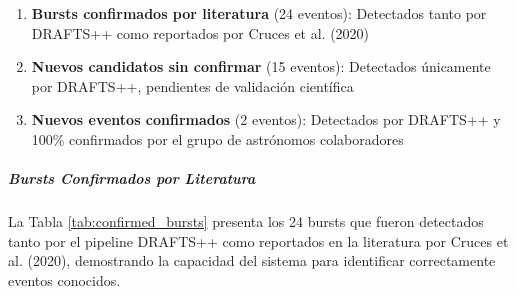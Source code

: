 \begin{enumerate}
    \item \textbf{Bursts confirmados por literatura} (24 eventos): Detectados tanto por DRAFTS++ como reportados por Cruces et al. (2020)
    \item \textbf{Nuevos candidatos sin confirmar} (15 eventos): Detectados únicamente por DRAFTS++, pendientes de validación científica
    \item \textbf{Nuevos eventos confirmados} (2 eventos): Detectados por DRAFTS++ y 100\% confirmados por el grupo de astrónomos colaboradores
\end{enumerate}

\subparagraph{Bursts Confirmados por Literatura}

La Tabla \ref{tab:confirmed_bursts} presenta los 24 bursts que fueron detectados tanto por el pipeline DRAFTS++ como reportados en la literatura por Cruces et al. (2020), demostrando la capacidad del sistema para identificar correctamente eventos conocidos.

